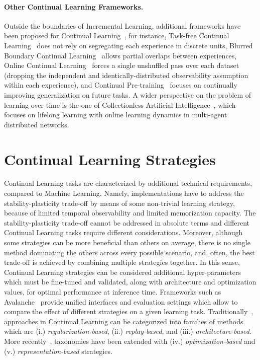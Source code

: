 \paragraph{Other Continual Learning Frameworks.}
Outside the boundaries of Incremental Learning, additional frameworks have been proposed for Continual Learning~\cite{wang2023comprehensive}, for instance, Task-free Continual Learning~\cite{aljundi2019task} does not rely on segregating each experience in discrete units, Blurred Boundary Continual Learning~\cite{bang2021rainbow} allows partial overlaps between experiences, Online Continual Learning~\cite{aljundi2019gradient} forces a single unshuffled pass over each dataset (dropping the independent and identically-distributed observability assumption within each experience), and Continual Pre-training~\cite{sun2020ernie} focuses on continually improving generalization on future tasks. A wider perspective on the problem of learning over time is the one of Collectionless Artificial Intelligence~\cite{gori2023collectionless}, which focuses on lifelong learning with online learning dynamics in multi-agent distributed networks.

\section{Continual Learning Strategies}
Continual Learning tasks are characterized by additional technical requirements, compared to Machine Learning. Namely, implementations have to address the stability-plasticity trade-off by means of some non-trivial learning strategy, because of limited temporal observability and limited memorization capacity.
The stability-plasticity trade-off cannot be addressed in absolute terms and different Continual Learning tasks require different considerations. Moreover, although some strategies can be more beneficial than others on average, there is no single method dominating the others across every possible scenario, and, often, the best trade-off is achieved by combining multiple strategies together.
In this sense, Continual Learning strategies can be considered additional hyper-parameters which must be fine-tuned and validated, along with architecture and optimization values, for optimal performance at inference time.
Frameworks such as Avalanche~\cite{lomonaco2021avalanche} provide unified interfaces and evaluation settings which allow to compare the effect of different strategies on a given learning task.
%
Traditionally~\cite{de2021continual}, approaches in Continual Learning can be categorized into families of methods which are (i.) \textit{regularization-based}, (ii.) \textit{replay-based}, and (iii.) \textit{architecture-based}. More recently~\cite{wang2023comprehensive}, taxonomies have been extended with (iv.) \textit{optimization-based} and (v.) \textit{representation-based} strategies. 

